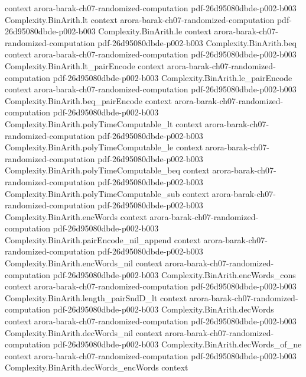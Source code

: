 \begin{theorem}
  {context}
  {arora-barak-ch07-randomized-computation}
  {pdf-26d95080dbde-p002-b003}
\proofstep
  {Complexity.BinArith.lt}
  {context}
  {arora-barak-ch07-randomized-computation}
  {pdf-26d95080dbde-p002-b003}
\proofstep
  {Complexity.BinArith.le}
  {context}
  {arora-barak-ch07-randomized-computation}
  {pdf-26d95080dbde-p002-b003}
\proofstep
  {Complexity.BinArith.beq}
  {context}
  {arora-barak-ch07-randomized-computation}
  {pdf-26d95080dbde-p002-b003}
\proofstep
  {Complexity.BinArith.lt_pairEncode}
  {context}
  {arora-barak-ch07-randomized-computation}
  {pdf-26d95080dbde-p002-b003}
\proofstep
  {Complexity.BinArith.le_pairEncode}
  {context}
  {arora-barak-ch07-randomized-computation}
  {pdf-26d95080dbde-p002-b003}
\proofstep
  {Complexity.BinArith.beq_pairEncode}
  {context}
  {arora-barak-ch07-randomized-computation}
  {pdf-26d95080dbde-p002-b003}
\proofstep
  {Complexity.BinArith.polyTimeComputable_lt}
  {context}
  {arora-barak-ch07-randomized-computation}
  {pdf-26d95080dbde-p002-b003}
\proofstep
  {Complexity.BinArith.polyTimeComputable_le}
  {context}
  {arora-barak-ch07-randomized-computation}
  {pdf-26d95080dbde-p002-b003}
\proofstep
  {Complexity.BinArith.polyTimeComputable_beq}
  {context}
  {arora-barak-ch07-randomized-computation}
  {pdf-26d95080dbde-p002-b003}
\proofstep
  {Complexity.BinArith.polyTimeComputable_sub}
  {context}
  {arora-barak-ch07-randomized-computation}
  {pdf-26d95080dbde-p002-b003}
\proofstep
  {Complexity.BinArith.encWords}
  {context}
  {arora-barak-ch07-randomized-computation}
  {pdf-26d95080dbde-p002-b003}
\proofstep
  {Complexity.BinArith.pairEncode_nil_append}
  {context}
  {arora-barak-ch07-randomized-computation}
  {pdf-26d95080dbde-p002-b003}
\proofstep
  {Complexity.BinArith.encWords_nil}
  {context}
  {arora-barak-ch07-randomized-computation}
  {pdf-26d95080dbde-p002-b003}
\proofstep
  {Complexity.BinArith.encWords_cons}
  {context}
  {arora-barak-ch07-randomized-computation}
  {pdf-26d95080dbde-p002-b003}
\proofstep
  {Complexity.BinArith.length_pairSndD_lt}
  {context}
  {arora-barak-ch07-randomized-computation}
  {pdf-26d95080dbde-p002-b003}
\proofstep
  {Complexity.BinArith.decWords}
  {context}
  {arora-barak-ch07-randomized-computation}
  {pdf-26d95080dbde-p002-b003}
\proofstep
  {Complexity.BinArith.decWords_nil}
  {context}
  {arora-barak-ch07-randomized-computation}
  {pdf-26d95080dbde-p002-b003}
\proofstep
  {Complexity.BinArith.decWords_of_ne}
  {context}
  {arora-barak-ch07-randomized-computation}
  {pdf-26d95080dbde-p002-b003}
\proofstep
  {Complexity.BinArith.decWords_encWords}
  {context}

\end{theorem}
